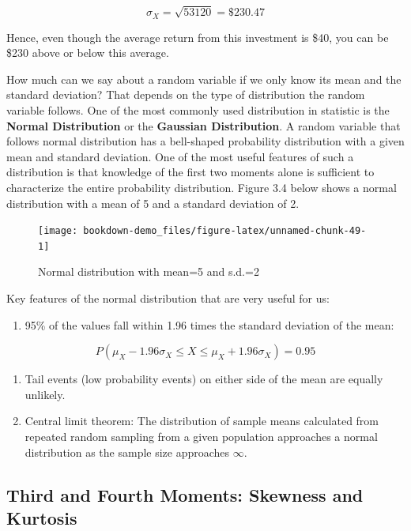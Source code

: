 \documentclass[]{book}
\providecommand{\tightlist}{%
  \setlength{\itemsep}{0pt}\setlength{\parskip}{0pt}}
\theoremstyle{definition}
\theoremstyle{definition}
\theoremstyle{definition}
\theoremstyle{remark}
\begin{document}
\[\sigma_X=\sqrt{53120}=\$230.47\]

Hence, even though the average return from this investment is \$40, you can be \$230 above or below this average.

How much can we say about a random variable if we only know its mean and the standard deviation? That depends on the type of distribution the random variable follows. One of the most commonly used distribution in statistic is the \textbf{Normal Distribution} or the \textbf{Gaussian Distribution}. A random variable that follows normal distribution has a bell-shaped probability distribution with a given mean and standard deviation. One of the most useful features of such a distribution is that knowledge of the first two moments alone is sufficient to characterize the entire probability distribution. Figure 3.4 below shows a normal distribution with a mean of 5 and a standard deviation of 2.

\begin{figure}

{\centering \texttt{[image: bookdown-demo\_files/figure-latex/unnamed-chunk-49-1]} 

}

\caption{Normal distribution with mean=5 and s.d.=2}\label{fig:unnamed-chunk-49}
\end{figure}

Key features of the normal distribution that are very useful for us:

\begin{enumerate}
\def\labelenumi{\alph{enumi}.}
\tightlist
\item
  95\% of the values fall within 1.96 times the standard deviation of the mean:
\end{enumerate}

\[P(\mu_X -1.96\sigma_X \leq X \leq \mu_X + 1.96\sigma_X)=0.95\]

\begin{enumerate}
\def\labelenumi{\alph{enumi}.}
\setcounter{enumi}{1}
\item
  Tail events (low probability events) on either side of the mean are equally unlikely.
\item
  Central limit theorem: The distribution of sample means calculated from repeated random sampling from a given population approaches a normal distribution as the sample size approaches \(\infty\).
\end{enumerate}

\hypertarget{third-and-fourth-moments-skewness-and-kurtosis}{%
\subsection{Third and Fourth Moments: Skewness and Kurtosis}\label{third-and-fourth-moments-skewness-and-kurtosis}}
\end{document}
